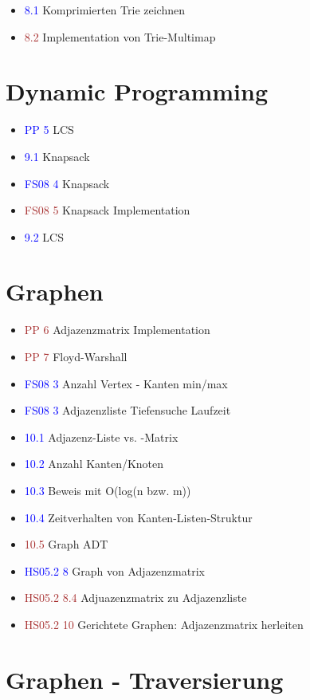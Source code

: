 \documentclass[a4paper,12pt]{article}
\newcommand{\ub}[1]{\textcolor{blue}{#1}}
\newcommand{\ubc}[1]{\textcolor{brown}{#1}}
\begin{document}
\begin{itemize}
  \item \ub{8.1} Komprimierten Trie zeichnen
  \item \ubc{8.2} Implementation von Trie-Multimap
\end{itemize}

\section{Dynamic Programming}

\begin{itemize}
  \item \ub{PP 5} LCS
  \item \ub{9.1} Knapsack
  \item \ub{FS08 4} Knapsack
  \item \ubc{FS08 5} Knapsack Implementation
  \item \ub{9.2} LCS
\end{itemize}

\section{Graphen}

\begin{itemize}
  \item \ubc{PP 6} Adjazenzmatrix Implementation
  \item \ubc{PP 7} Floyd-Warshall
  \item \ub{FS08 3} Anzahl Vertex - Kanten min/max
  \item \ub{FS08 3} Adjazenzliste Tiefensuche Laufzeit
  \item \ub{10.1} Adjazenz-Liste vs. -Matrix
  \item \ub{10.2} Anzahl Kanten/Knoten
  \item \ub{10.3} Beweis mit O(log(n bzw. m))
  \item \ub{10.4} Zeitverhalten von Kanten-Listen-Struktur
  \item \ubc{10.5} Graph ADT
  \item \ub{HS05.2 8} Graph von Adjazenzmatrix
  \item \ubc{HS05.2 8.4} Adjuazenzmatrix zu Adjazenzliste
  \item \ubc{HS05.2 10} Gerichtete Graphen: Adjazenzmatrix herleiten
\end{itemize}

\section{Graphen - Traversierung}
\end{document}
